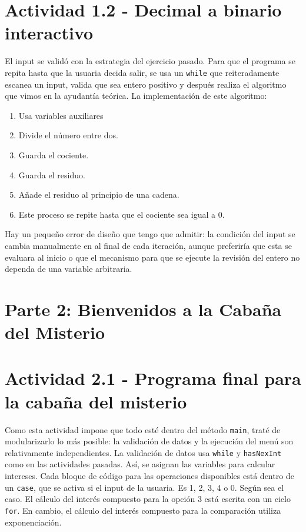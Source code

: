\documentclass{article}
\begin{document}
		\section*{Actividad 1.2 - Decimal a binario interactivo}
			El input se validó con la estrategia del ejercicio pasado. Para que el programa se repita hasta que la usuaria decida salir, se usa
			un \texttt{while} que reiteradamente escanea un input, valida que sea entero positivo y después realiza el algoritmo que vimos en la ayudantía
			teórica. La implementación de este algoritmo:
			\begin{enumerate}
				\item Usa variables auxiliares 
				\item Divide el número entre dos.
				\item Guarda el cociente.
				\item Guarda el residuo.
				\item Añade el residuo al principio de una cadena. 
				\item Este proceso se repite hasta que el cociente sea igual a 0.
			\end{enumerate}
			Hay un pequeño error de diseño que tengo que admitir: la condición del input se cambia manualmente en al final de cada iteración, aunque
			preferiría que esta se evaluara al inicio o que el mecanismo para que se ejecute la revisión del entero no dependa de una variable arbitraria.
	\section*{Parte 2: Bienvenidos a la Cabaña del Misterio}
		\section*{Actividad 2.1 - Programa final para la cabaña del misterio}
			Como esta actividad impone que todo esté dentro del método \texttt{main}, traté de modularizarlo lo más posible: la validación de datos y la
			ejecución del menú son relativamente independientes. La validación de datos usa \texttt{while} y \texttt{hasNexInt} como en las actividades
			pasadas. Así, se asignan las variables para calcular intereses. Cada bloque de código para las operaciones disponibles está dentro de un
			\texttt{case}, que se activa si el input de la usuaria. Es 1, 2, 3, 4 o 0. Según sea el caso. El cálculo del interés compuesto para la opción
			3 está escrita con un ciclo \texttt{for}. En cambio, el cálculo del interés compuesto para la comparación utiliza exponenciación.
\end{document}
